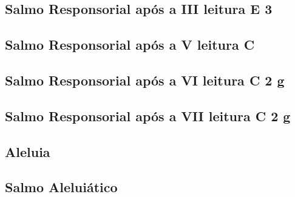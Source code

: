 
\subsection{Salmo Responsorial após a III leitura \textmd{E 3}}\label{subsection:hebdomada-sancta/ad-vigiliam-paschalem-in-nocte-sancta/psalmus-responsorius-1}

\AllowPageFlush

\subsection{Salmo Responsorial após a V leitura \textmd{C \protect\GreMediatioMark}}\label{subsection:hebdomada-sancta/ad-vigiliam-paschalem-in-nocte-sancta/psalmus-responsorius-2}

\subsection{Salmo Responsorial após a VI leitura \textmd{C 2 g}}\label{subsection:hebdomada-sancta/ad-vigiliam-paschalem-in-nocte-sancta/psalmus-responsorius-3}

\AllowPageFlush

\subsection{Salmo Responsorial após a VII leitura \textmd{C 2 g}}\label{subsection:hebdomada-sancta/ad-vigiliam-paschalem-in-nocte-sancta/psalmus-responsorius-4}

\AllowPageFlush

\subsection{Aleluia}\label{subsection:hebdomada-sancta/ad-vigiliam-paschalem-in-nocte-sancta/alleluia}

\subsection{Salmo Aleluiático}\label{subsection:hebdomada-sancta/ad-vigiliam-paschalem-in-nocte-sancta/psalmus-alleluiaticus}

